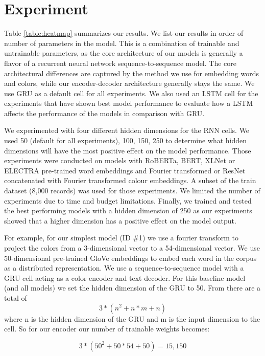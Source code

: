 \section{Experiment}

Table \ref{table:heatmap} summarizes our results. We list our results in order of number of parameters in the model. This is a combination of trainable and untrainable parameters, as the core architecture of our models is generally a flavor of a recurrent neural network sequence-to-sequence model. The core architectural differences are captured by the method we use for embedding words and colors, while our encoder-decoder architecture generally stays the same. We use GRU as a default cell for all experiments. We also used an LSTM cell for the experiments that have shown best model performance to evaluate how a LSTM affects the performance of the models in comparison with GRU.

\par
We experimented with four different hidden dimensions for the RNN cells. We used 50 (default for all experiments), 100, 150, 250 to determine what hidden dimensions will have the most positive effect on the model performance. Those experiments were conducted on models with RoBERTa, BERT, XLNet or ELECTRA pre-trained word embeddings and Fourier transformed or ResNet concatenated with Fourier transformed colour embeddings. A subset of the train dataset (8,000 records) was used for those experiments. We limited the number of experiments due to time and budget limitations. Finally, we trained and tested the best performing models with a hidden dimension of 250 as our experiments showed that a higher dimension has a positive effect on the model output.

\par
For example, for our simplest model (ID \#1) we use a fourier transform to project the colors from a 3-dimensional vector to a 54-dimensional vector. We use 50-dimensional pre-trained GloVe embeddings to embed each word in the corpus as a distributed representation. We use a sequence-to-sequence model with a GRU cell acting as a color encoder and text decoder.  For this baseline model (and all models) we set the hidden dimension of the GRU to 50. From \citep{dey-2017-gru} there are a total of \[3*(n^2 + n*m +n)\] where n is the hidden dimension of the GRU and m is the input dimension to the cell. So for our encoder our number of trainable weights becomes:

\[3*(50^2 + 50*54 +50) = 15,150\]

